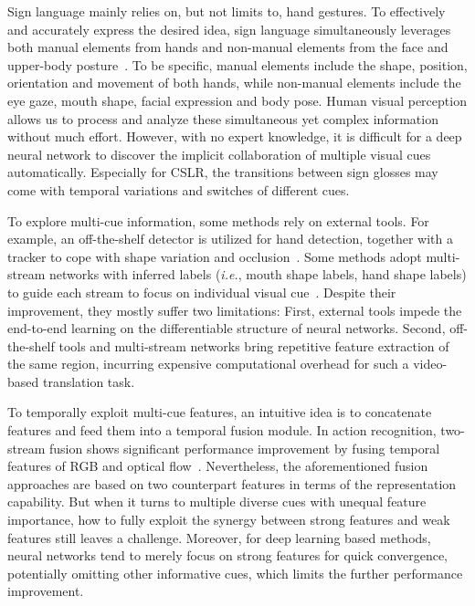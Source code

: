 \documentclass[letterpaper]{article} \usepackage{aaai20}  \usepackage{times}  \usepackage{helvet} \usepackage{courier}  \usepackage[hyphens]{url}  \usepackage{graphicx} \urlstyle{rm} \def\UrlFont{\rm}  \usepackage{graphicx}  \frenchspacing  \setlength{\pdfpagewidth}{8.5in}  \setlength{\pdfpageheight}{11in}
\begin{document}
Sign language mainly relies on, but not limits to, hand gestures. 
To effectively and accurately express the desired idea, sign language simultaneously leverages both manual elements from hands and non-manual elements from the face and upper-body posture~\cite{phoenixdataset2014}. 
To be specific, manual elements include the shape, position, orientation and movement of both hands, 
while non-manual elements include the eye gaze, mouth shape, facial expression and body pose. 
Human visual perception allows us to process and analyze these simultaneous yet complex information without much effort. 
However, with no expert knowledge, it is difficult for a deep neural network to discover the implicit collaboration of multiple visual cues automatically. 
Especially for CSLR, the transitions between sign glosses may come with temporal variations and switches of different cues.


To explore multi-cue information, some methods rely on external tools. 
For example, an off-the-shelf detector is utilized for hand detection, together with a tracker to cope with shape variation and occlusion~\cite{subunet,han}. 
Some methods adopt multi-stream networks with inferred labels (\emph{i.e.}, mouth shape labels, hand shape labels) to guide each stream to focus on individual visual cue~\cite{tpami19}. 
Despite their improvement, they mostly suffer two limitations: 
First, external tools impede the end-to-end learning on the differentiable structure of neural networks. 
Second, off-the-shelf tools and multi-stream networks bring repetitive feature extraction of the same region, incurring expensive computational overhead for such a video-based translation task.


To temporally exploit multi-cue features, an intuitive idea is to concatenate features and feed them into a temporal fusion module. In action recognition, two-stream fusion shows significant performance improvement by fusing temporal features of RGB and optical flow~\cite{vgg-two-stream,vgg-two-stream-2}. 
Nevertheless, the aforementioned fusion approaches are based on two counterpart features in terms of the representation capability. 
But when it turns to multiple diverse cues with unequal feature importance, how to fully exploit the synergy between strong features and weak features still leaves a challenge. 
Moreover, for deep learning based methods, neural networks tend to merely focus on strong features for quick convergence, potentially omitting other informative cues, which limits the further performance improvement.
\end{document}
